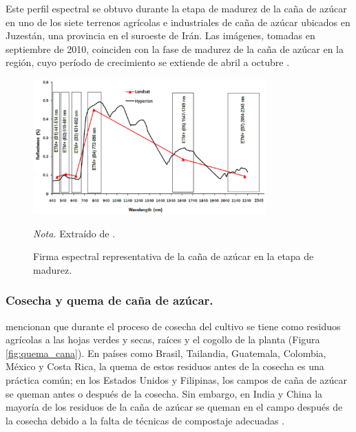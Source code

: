 Este perfil espectral se obtuvo durante la etapa de madurez de la caña de azúcar en uno de los siete terrenos agrícolas e industriales de caña de azúcar ubicados en Juzestán, una provincia en el suroeste de Irán. Las imágenes, tomadas en septiembre de 2010, coinciden con la fase de madurez de la caña de azúcar en la región, cuyo período de crecimiento se extiende 
de abril a octubre \citep{iran_sugarcane_2015}.
\begin{figure}[H]
    \centering
    \caption{Firma espectral representativa de la caña de azúcar en la etapa de madurez.} 
    \includegraphics[width=0.8\textwidth]{img/4_marco_teorico/firma_cana.png}
    \label{fig:firma_cana}
    \begin{flushleft}
        \textit{Nota.} Extraído de \citet{hamzeh2016assessing}. 
        \vspace{-\baselineskip}
    \end{flushleft}
\end{figure}

\subsubsection{Cosecha y quema de caña de azúcar.}
\citet{pipicano_alisis_2022} mencionan que durante el proceso de cosecha del cultivo se tiene como residuos agrícolas a las hojas verdes y secas, raíces y el
cogollo de la planta (Figura \ref{fig:quema_cana}). En países como Brasil, Tailandia, Guatemala, Colombia, México y Costa Rica, la quema de estos residuos antes 
de la cosecha es una práctica común; en los Estados Unidos y Filipinas, los campos de caña de azúcar se queman antes o después de la cosecha. Sin embargo, en India y 
China la mayoría de los residuos de la caña de azúcar se queman en el campo después de la cosecha debido a la falta de técnicas de compostaje adecuadas 
\citep{world_bank_group,junpen_estimation_2020}.

